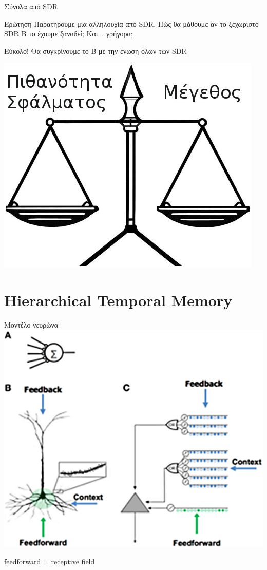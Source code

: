 \documentclass[11pt,center]{beamer}
\begin{document}

\begin{frame} {Σύνολα από SDR}
  \begin{block}{Ερώτηση}
    Παρατηρούμε μια αλληλουχία από SDR. Πώς θα μάθουμε αν το ξεχωριστό SDR Β το έχουμε ξαναδεί; Και... γρήγορα;
  \end{block}

  \pause
  \vspace{1em}
  \begin{block}{Εύκολο!}
    Θα συγκρίνουμε το Β με την \alert{ένωση} όλων των SDR
  \end{block}

  \pause
  \vspace{0.5em}
  \centering
  \includegraphics[width=.5\textwidth]{../pics/balance}
\end{frame}


\section{Hierarchical Temporal Memory}

\begin{frame}{Μοντέλο νευρώνα \tiny{\cite{neuronssynapses}}}
  \centering
  \includegraphics[width=.75\textwidth]{../pics/neuron-model}

  feedforward = receptive field
\end{frame}
\end{document}
